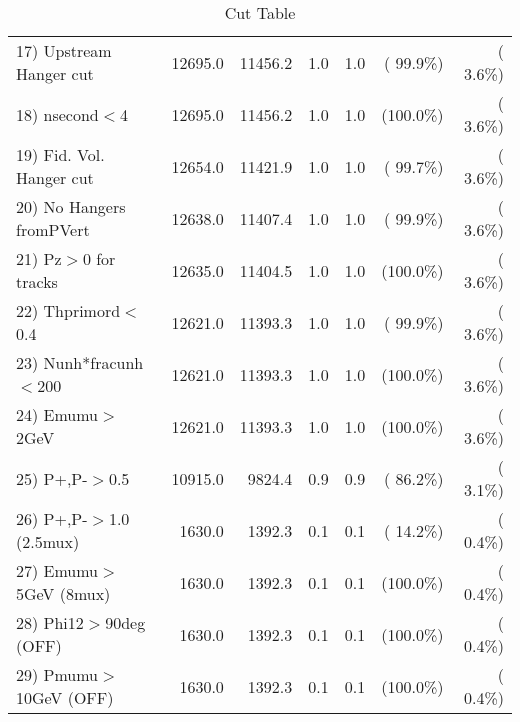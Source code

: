 \begin{table}[h!]
\begin{tabular}{||l||r|r|r|r|r|r||}
 17) Upstream Hanger cut  &      12695.0 &      11456.2 &          1.0 &          1.0 & ( 99.9\%) & (  3.6\%) \\
 18) nsecond$<$4          &      12695.0 &      11456.2 &          1.0 &          1.0 & (100.0\%) & (  3.6\%) \\
 19) Fid. Vol. Hanger cut &      12654.0 &      11421.9 &          1.0 &          1.0 & ( 99.7\%) & (  3.6\%) \\
 20) No Hangers fromPVert &      12638.0 &      11407.4 &          1.0 &          1.0 & ( 99.9\%) & (  3.6\%) \\
 21) Pz$>$0 for tracks    &      12635.0 &      11404.5 &          1.0 &          1.0 & (100.0\%) & (  3.6\%) \\
 22) Thprimord$<$0.4      &      12621.0 &      11393.3 &          1.0 &          1.0 & ( 99.9\%) & (  3.6\%) \\
 23) Nunh*fracunh$<$200   &      12621.0 &      11393.3 &          1.0 &          1.0 & (100.0\%) & (  3.6\%) \\
 24) Emumu$>$2GeV         &      12621.0 &      11393.3 &          1.0 &          1.0 & (100.0\%) & (  3.6\%) \\
 25) P+,P-$>$0.5          &      10915.0 &       9824.4 &          0.9 &          0.9 & ( 86.2\%) & (  3.1\%) \\
 26) P+,P-$>$1.0 (2.5mux) &       1630.0 &       1392.3 &          0.1 &          0.1 & ( 14.2\%) & (  0.4\%) \\
 27) Emumu$>$5GeV  (8mux) &       1630.0 &       1392.3 &          0.1 &          0.1 & (100.0\%) & (  0.4\%) \\
 28) Phi12$>$90deg  (OFF) &       1630.0 &       1392.3 &          0.1 &          0.1 & (100.0\%) & (  0.4\%) \\
 29) Pmumu$>$10GeV  (OFF) &       1630.0 &       1392.3 &          0.1 &          0.1 & (100.0\%) & (  0.4\%) \\
 \hline
 \hline
 \end{tabular}
 \caption{Cut Table           }
 \label{tab-cutcohjpsi-mumu_jpsi}
 \end{table}
